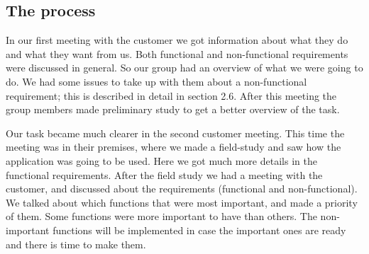 \subsection{ The process}
	In our first meeting with the customer we got information about what they do and what they want from us. Both functional and non-functional requirements were discussed in general. So our group had an overview of what we were going to do. We had some issues to take up with them about a non-functional requirement; this is described in detail in section 2.6. After this meeting the group members made preliminary study to get a better overview of the task.

Our task became much clearer in the second customer meeting. This time the meeting was in their premises, where we made a field-study and saw how the application was going to be used. Here we got much more details in the functional requirements. After the field study we had a meeting with the customer, and discussed about the requirements (functional and non-functional). We talked about which functions that were most important, and made a priority of them. Some functions were more important to have than others. The non-important functions will be implemented in case the important ones are ready and there is time to make them.

